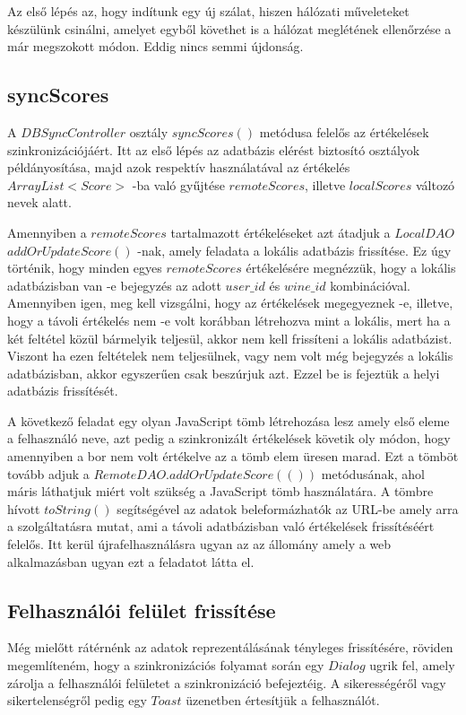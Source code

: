 \documentclass[12pt]{report}
\theoremstyle{definition}
\begin{document}
	Az első lépés az, hogy indítunk egy új szálat, hiszen hálózati műveleteket készülünk csinálni, amelyet egyből követhet is a hálózat meglétének ellenőrzése a már megszokott módon. Eddig nincs semmi újdonság.
	
	\subsection{syncScores}
	A $DBSyncController$ osztály $syncScores\left(\right)$ metódusa felelős az értékelések szinkronizációjáért. Itt az első lépés az adatbázis elérést biztosító osztályok példányosítása, majd azok respektív használatával az értékelés $ArrayList<Score>$ -ba való gyűjtése \linebreak$remoteScores$, illetve $localScores$ változó nevek alatt.
	
	Amennyiben a $remoteScores$ tartalmazott értékeléseket azt átadjuk a $LocalDAO$ \linebreak$addOrUpdateScore\left(\right)$ -nak, amely feladata a lokális adatbázis frissítése. Ez úgy történik, hogy minden egyes $remoteScores$ értékelésére megnézzük, hogy a lokális adatbázisban van -e bejegyzés az adott $user\_id$ és $wine\_id$ kombinációval. Amennyiben igen, meg kell vizsgálni, hogy az értékelések megegyeznek -e, illetve, hogy a távoli értékelés nem -e volt korábban létrehozva mint a lokális, mert ha a két feltétel közül bármelyik teljesül, akkor nem kell frissíteni a lokális adatbázist. Viszont ha ezen feltételek nem teljesülnek, vagy nem volt még bejegyzés a lokális adatbázisban, akkor egyszerűen csak beszúrjuk azt. Ezzel be is fejeztük a helyi adatbázis frissítését.
	
	A következő feladat egy olyan JavaScript tömb létrehozása lesz amely első eleme a felhasználó neve, azt pedig a szinkronizált értékelések követik oly módon, hogy amennyiben a bor nem volt értékelve az a tömb elem üresen marad. Ezt a tömböt tovább adjuk a $RemoteDAO.addOrUpdateScore\left(()\right)$ metódusának, ahol máris láthatjuk miért volt szükség a JavaScript tömb használatára. A tömbre hívott $toString\left(\right)$ segítségével az adatok beleformázhatók az URL-be amely arra a szolgáltatásra mutat, ami a távoli adatbázisban való értékelések frissítéséért felelős. Itt kerül újrafelhasználásra ugyan az az állomány amely a web alkalmazásban ugyan ezt a feladatot látta el.
	
	\subsection{Felhasználói felület frissítése}
	Még mielőtt rátérnénk az adatok reprezentálásának tényleges frissítésére, röviden megemlíteném, hogy a szinkronizációs folyamat során egy $Dialog$ ugrik fel, amely zárolja a felhasználói felületet a szinkronizáció befejeztéig. A sikerességéről vagy sikertelenségről pedig egy $Toast$ üzenetben értesítjük a felhasználót.
	
\end{document}
